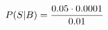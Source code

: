 \documentclass[preview]{standalone}
\begin{document}
\begin{align*}
\special{dvisvgm:raw <g id='unique000'>}P(S|B) = \frac{0.05 \cdot 0.0001}{0.01}\special{dvisvgm:raw </g>}
\end{align*}
\end{document}
